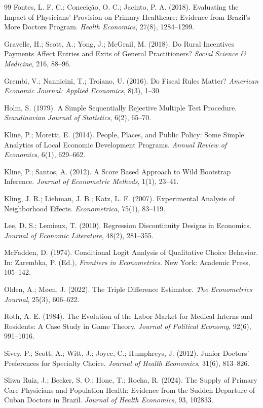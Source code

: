 \documentclass[11pt,a4paper]{article}
\begin{document}
\begin{thebibliography}{99}
Fontes, L. F. C.; Conceição, O. C.; Jacinto, P. A. (2018). Evaluating the
Impact of Physicians' Provision on Primary Healthcare: Evidence from Brazil's
More Doctors Program. \textit{Health Economics}, 27(8), 1284--1299.

Gravelle, H.; Scott, A.; Yong, J.; McGrail, M. (2018). Do Rural Incentives
Payments Affect Entries and Exits of General Practitioners?
\textit{Social Science \& Medicine}, 216, 88--96.

Grembi, V.; Nannicini, T.; Troiano, U. (2016). Do Fiscal Rules Matter?
\textit{American Economic Journal: Applied Economics}, 8(3), 1--30.

Holm, S. (1979). A Simple Sequentially Rejective Multiple Test Procedure.
\textit{Scandinavian Journal of Statistics}, 6(2), 65--70.

Kline, P.; Moretti, E. (2014). People, Places, and Public Policy: Some Simple
Analytics of Local Economic Development Programs.
\textit{Annual Review of Economics}, 6(1), 629--662.

Kline, P.; Santos, A. (2012). A Score Based Approach to Wild Bootstrap
Inference. \textit{Journal of Econometric Methods}, 1(1), 23--41.

Kling, J. R.; Liebman, J. B.; Katz, L. F. (2007). Experimental Analysis of
Neighborhood Effects. \textit{Econometrica}, 75(1), 83--119.

Lee, D. S.; Lemieux, T. (2010). Regression Discontinuity Designs in
Economics. \textit{Journal of Economic Literature}, 48(2), 281--355.

McFadden, D. (1974). Conditional Logit Analysis of Qualitative Choice
Behavior. In: Zarembka, P. (Ed.), \textit{Frontiers in Econometrics}.
New York: Academic Press, 105--142.

Olden, A.; Møen, J. (2022). The Triple Difference Estimator.
\textit{The Econometrics Journal}, 25(3), 606--622.

Roth, A. E. (1984). The Evolution of the Labor Market for Medical Interns and
Residents: A Case Study in Game Theory.
\textit{Journal of Political Economy}, 92(6), 991--1016.

Sivey, P.; Scott, A.; Witt, J.; Joyce, C.; Humphreys, J. (2012). Junior
Doctors' Preferences for Specialty Choice.
\textit{Journal of Health Economics}, 31(6), 813--826.

Sliwa Ruiz, J.; Becker, S. O.; Hone, T.; Rocha, R. (2024). The Supply of
Primary Care Physicians and Population Health: Evidence from the Sudden
Departure of Cuban Doctors in Brazil.
\textit{Journal of Health Economics}, 93, 102833.

\end{thebibliography}
\end{document}
